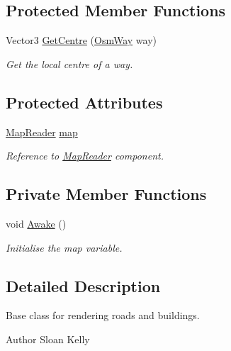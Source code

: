 \subsection*{Protected Member Functions}
\begin{DoxyCompactItemize}
\item 
Vector3 \mbox{\hyperlink{class_infrastructure_behaviour_af9591282d45cf5a400099db0d8317ce6}{Get\+Centre}} (\mbox{\hyperlink{class_osm_way}{Osm\+Way}} way)
\begin{DoxyCompactList}\small\item\em Get the local centre of a way. \end{DoxyCompactList}\end{DoxyCompactItemize}
\subsection*{Protected Attributes}
\begin{DoxyCompactItemize}
\item 
\mbox{\hyperlink{class_map_reader}{Map\+Reader}} \mbox{\hyperlink{class_infrastructure_behaviour_ab6edad926583d4997971b8ac31346846}{map}}
\begin{DoxyCompactList}\small\item\em Reference to \mbox{\hyperlink{class_map_reader}{Map\+Reader}} component. \end{DoxyCompactList}\end{DoxyCompactItemize}
\subsection*{Private Member Functions}
\begin{DoxyCompactItemize}
\item 
void \mbox{\hyperlink{class_infrastructure_behaviour_a891b2aa802037993c1ad9d49cb6089cd}{Awake}} ()
\begin{DoxyCompactList}\small\item\em Initialise the map variable. \end{DoxyCompactList}\end{DoxyCompactItemize}


\subsection{Detailed Description}
Base class for rendering roads and buildings. 

\begin{DoxyAuthor}{Author}
Sloan Kelly
\end{DoxyAuthor}



